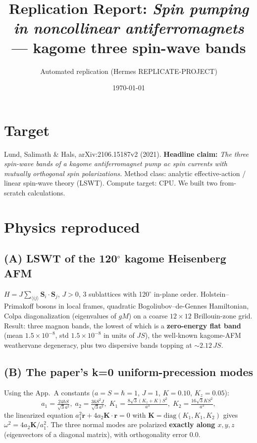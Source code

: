 \documentclass[11pt]{article}
\title{Replication Report: \emph{Spin pumping in noncollinear
antiferromagnets} --- kagome three spin-wave bands}
\author{Automated replication (Hermes REPLICATE-PROJECT)}
\date{\today}
\begin{document}
\maketitle

\section{Target}
Lund, Salimath \& Hals, arXiv:2106.15187v2 (2021). \textbf{Headline claim:}
\emph{The three spin-wave bands of a kagome antiferromagnet pump ac spin
currents with mutually orthogonal spin polarizations.} Method class:
analytic effective-action / linear spin-wave theory (LSWT). Compute target:
CPU. We built two from-scratch calculations.

\section{Physics reproduced}
\subsection{(A) LSWT of the 120$^\circ$ kagome Heisenberg AFM}
$H = J\sum_{\langle ij\rangle}\mathbf S_i\cdot\mathbf S_j$, $J>0$, 3
sublattices with 120$^\circ$ in-plane order. Holstein--Primakoff bosons in
local frames, quadratic Bogoliubov--de-Gennes Hamiltonian, Colpa
diagonalization (eigenvalues of $gM$) on a coarse $12\times12$ Brillouin-zone
grid. Result: three magnon bands, the lowest of which is a
\textbf{zero-energy flat band} (mean $1.5\times10^{-8}$, std
$1.5\times10^{-8}$ in units of $JS$), the well-known kagome-AFM weathervane
degeneracy, plus two dispersive bands topping at $\sim2.12\,JS$.

\subsection{(B) The paper's k=0 uniform-precession modes}
Using the App.~A constants ($a=S=\hbar=1$, $J=1$, $K=0.10$, $K_z=0.05$):
\[
a_1=\tfrac{24\hbar S}{\sqrt3 a^2},\;
a_2=\tfrac{36S^2J}{\sqrt3 a^2},\;
K_1=\tfrac{8\sqrt3(K_z+K)S^2}{a^3},\;
K_2=\tfrac{16\sqrt3 K S^2}{a^3},
\]
the linearized equation $a_1^2\ddot{\mathbf r}+4a_2\mathbf K\cdot\mathbf r=0$
with $\mathbf K=\mathrm{diag}(K_1,K_1,K_2)$ gives $\omega^2=4a_2\mathbf
K/a_1^2$. The three normal modes are polarized \textbf{exactly along
$x,y,z$} (eigenvectors of a diagonal matrix), with orthogonality error
$0.0$.
\end{document}
